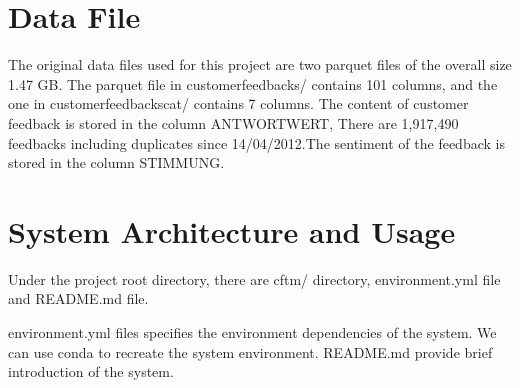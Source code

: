 \documentclass{article} %
\begin{document}



    \section{Data File}
    The original data files used for this project are two parquet files of the overall size 1.47 GB. The parquet file in customer\textunderscore{}feedbacks/ contains 101 columns, and the one in customer\textunderscore{}feedbacks\textunderscore{}cat/ contains 7 columns. The content of customer feedback is stored in the column ANTWORT\textunderscore{}WERT, There are 1,917,490 feedbacks including duplicates since 14/04/2012.The sentiment of the feedback is stored in the column STIMMUNG.

    \section{System Architecture and Usage}
    Under the project root directory, there are cftm/ directory, environment.yml file and README.md file.

    environment.yml files specifies the environment dependencies of the system. We can use conda to recreate the system environment. README.md provide brief introduction of the system.
\end{document}
